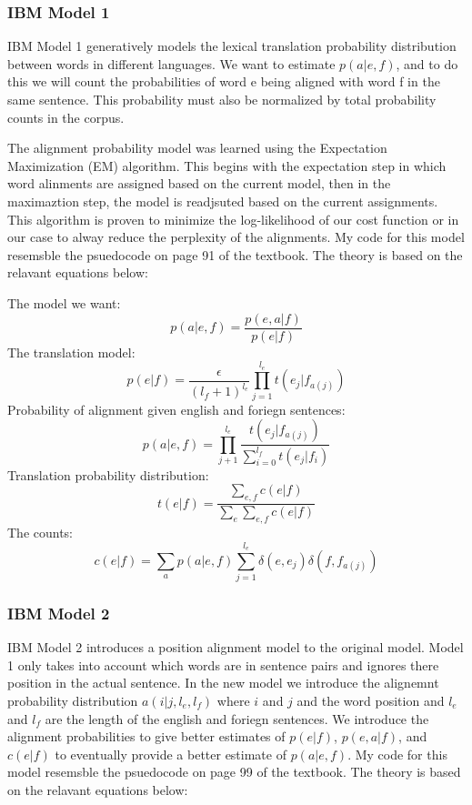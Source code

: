 \documentclass{article}
\begin{document}
\subsubsection{IBM Model 1}
\par
IBM Model 1 generatively models  the lexical translation probability distribution between words in different languages.  We want to estimate $p(a|e,f)$, and to do this we will count the probabilities of word e being aligned with word f in the same sentence. This probability must also be normalized by total probability counts in the corpus. 
\par
The alignment probability model was learned using the Expectation Maximization (EM) algorithm. This begins with the expectation step in which word alinments are assigned based on the current model, then in the maximaztion step, the model is readjsuted based on the current assignments. This algorithm is proven to minimize the log-likelihood of our cost function or in our case to alway reduce the perplexity of the alignments. My code for this model resemsble the psuedocode on page 91 of the textbook. The theory is based on the relavant equations below:\\
\par
The model we want:
$$ p(a|e,f) = \frac{p(e,a|f)}{p(e|f)} $$ 
The translation model:
$$ p(e|f) = \frac{\epsilon}{(l_f + 1)^{l_e}} \prod_{j=1}^{l_e}{t(e_j|f_{a(j)})} $$
Probability of alignment given english and foriegn sentences:
$$ p(a|e,f) = \prod_{j+1}^{l_e}{\frac{t(e_j|f_{a(j)})}{\sum_{i=0}^{l_f}{t(e_j|f_i)}}} $$
Translation probability distribution:
$$ t(e|f) = \frac{\sum_{e,f}{c(e|f)}}{\sum_{e}\sum_{e,f}{c(e|f)}} $$ 
The counts:
$$ c(e|f) = \sum_{a}{p(a|e,f)}\sum_{j=1}^{l_e}{\delta(e,e_j)\delta(f,f_{a(j)})} $$


\subsubsection{IBM Model 2}
IBM Model 2 introduces a position alignment model to the original model. Model 1 only takes into account which words are in sentence pairs and ignores there position in the actual sentence. In the new model we introduce the alignemnt probability distribution $a(i|j,l_e,l_f)$ where $i$ and $j$ and the word position and $l_e$ and $l_f$ are the length of the english and foriegn sentences. We introduce the alignment probabilities to give better estimates of $p(e|f)$, $p(e,a|f)$, and $c(e|f)$ to eventually provide a better estimate of $p(a|e,f)$. My code for this model resemsble the psuedocode on page 99 of the textbook. The theory is based on the relavant equations below:\\
\end{document}
